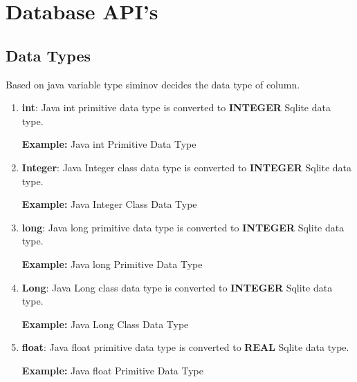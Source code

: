 \newpage
\chapter {\Large{Database API's}}


\section{Data Types}
Based on java variable type siminov decides the data type of column.

\begin{enumerate}

	\item \small \textbf{int}: Java int primitive data type is converted to \textbf{INTEGER} Sqlite data type.

		\par
		\textbf{Example:} Java int  Primitive Data Type
			

	\item \small \textbf{Integer}: Java Integer class data type is converted to \textbf{INTEGER} Sqlite data type.

		\par
		\textbf{Example:} Java Integer Class Data Type
			

	\item \small \textbf{long}: Java long primitive data type is converted to \textbf{INTEGER} Sqlite data type.

		\par
		\textbf{Example:} Java long Primitive Data Type
			

	\item \small \textbf{Long}: Java Long class data type is converted to \textbf{INTEGER} Sqlite data type.

		\par
		\textbf{Example:} Java Long Class Data Type
			

	\item \small \textbf{float}: Java float primitive data type is converted to \textbf{REAL} Sqlite data type.

		\par
		\textbf{Example:} Java float Primitive Data Type
			


\end{enumerate}
